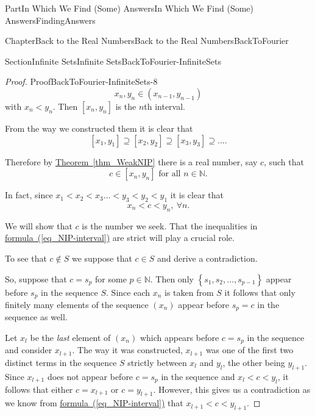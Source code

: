 \documentclass[oneside,10pt,]{book}
\newcommand{\xreffont}{\relax}
\numberwithin{equation}{part}
\newcommand{\NN}{\mathbb {N}}
\newcommand{\lt}{<}
\begin{document}
\begin{partptx}{Part}{In Which We Find (Some) Answers}{}{In Which We Find (Some) Answers}{}{}{FindingAnswers}
\begin{chapterptx}{Chapter}{Back to the Real Numbers}{}{Back to the Real Numbers}{}{}{BackToFourier}
\begin{sectionptx}{Section}{Infinite Sets}{}{Infinite Sets}{}{}{BackToFourier-InfiniteSets}
\begin{proof}{Proof}{}{BackToFourier-InfiniteSets-8}
\begin{equation*}
x_n, y_n \in
\left(x_{n-1}, y_{n-1}\right) 
\end{equation*}
with \(x_n\lt y_n\). Then \(\left[x_n,
y_n\right]\) is the \(n\)th interval.%
\par
From the way we constructed them it is clear that%
\begin{equation*}
\left[x_1, y_1\right] \supseteq \left[x_2, y_2\right]
\supseteq \left[x_3, y_3\right] \supseteq \ldots \text{.}
\end{equation*}
%
\par
Therefore by \hyperref[thm_WeakNIP]{Theorem~{\xreffont\ref{thm_WeakNIP}}} there is a real number, say \(c\), such that%
\begin{equation*}
c\in\left[x_n,
y_n\right] \text{ for all } n\in\NN \text{.}
\end{equation*}
%
\par
In fact, since \(x_1\lt x_2\lt x_3\ldots\lt y_3\lt y_2\lt
y_1\) it is clear that%
\begin{equation}
x_n\lt c\lt y_n, \ \forall n\text{.}\label{eq_NIP-interval}
\end{equation}
%
\par
We will show that \(c\) is the number we seek.  That the inequalities in \hyperref[eq_NIP-interval]{formula~({\xreffont\ref{eq_NIP-interval}})} are strict will play a crucial role.%
\par
To see that \(c\not\in S\) we suppose that \(c\in S\) and derive a contradiction.%
\par
So, suppose that \(c=s_p\) for some \(p\in\NN\).  Then only \(\left\{s_1, s_2,\ldots, s_{p-1}\right\}\) appear before \(s_p\) in the sequence \(S\).  Since each \(x_n\) is taken from \(S\) it follows that only finitely many elements of the sequence \((x_n)\) appear before \(s_p=c\) in the sequence as well.%
\par
Let \(x_l\) be the \emph{last} element of \((x_n)\) which appears before \(c=s_p\) in the sequence and consider \(x_{l+1}\).  The way it was constructed, \(x_{l+1}\) was one of the first two distinct terms in the sequence \(S\) strictly between \(x_l\) and \(y_l\), the other being \(y_{l+1}\).  Since \(x_{l+1}\) does not appear before \(c=s_p\) in the sequence and \(x_l\lt c\lt
y_l\), it follows that either \(c=x_{l+1}\) or \(c=y_{l+1}\).  However, this gives us a contradiction as we know from \hyperref[eq_NIP-interval]{formula~({\xreffont\ref{eq_NIP-interval}})} that \(x_{l+1}\lt c\lt y_{l+1}\).%
\par

\end{proof}
\end{sectionptx}
\end{chapterptx}
\end{partptx}
\end{document}
